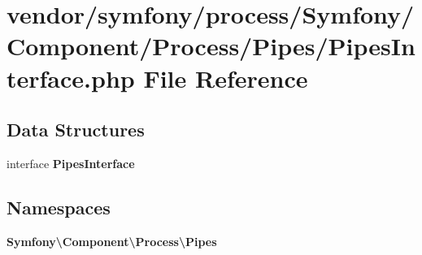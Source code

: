 \section{vendor/symfony/process/\+Symfony/\+Component/\+Process/\+Pipes/\+Pipes\+Interface.php File Reference}
\label{_pipes_interface_8php}
\subsection*{Data Structures}
\begin{DoxyCompactItemize}
\item 
interface {\bf Pipes\+Interface}
\end{DoxyCompactItemize}
\subsection*{Namespaces}
\begin{DoxyCompactItemize}
\item 
 {\bf Symfony\textbackslash{}\+Component\textbackslash{}\+Process\textbackslash{}\+Pipes}
\end{DoxyCompactItemize}
